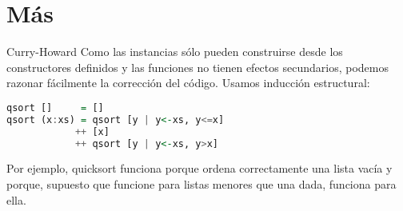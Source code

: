 \section{Más}

\begin{frame}[fragile]{Curry-Howard}
  Como las instancias sólo pueden construirse desde los constructores definidos
  y las funciones no tienen efectos secundarios, podemos razonar fácilmente la
  corrección del código. Usamos inducción estructural:
  
  \begin{lstlisting}[language=haskell]
qsort []     = []
qsort (x:xs) = qsort [y | y<-xs, y<=x]
            ++ [x]
            ++ qsort [y | y<-xs, y>x]
  \end{lstlisting}
  
  Por ejemplo, quicksort funciona porque ordena correctamente una lista vacía y porque, supuesto
  que funcione para listas menores que una dada, funciona para ella.
\end{frame}